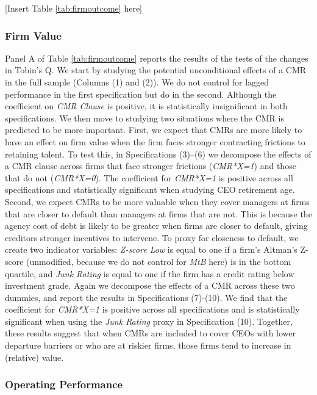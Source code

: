 \documentclass[a4paper,12pt]{article}
\begin{document}
\begin{center}
  [Insert Table \ref{tab:firmoutcome} here]
\end{center}


\subsubsection{Firm Value}

Panel A of Table \ref{tab:firmoutcome} reports the results of the tests of the changes in Tobin's Q.
We start by studying the potential unconditional effects of a CMR in the full sample (Columns (1) and (2)).
We do not control for lagged performance in the first specification but do in the second.
Although the coefficient on \textit{CMR Clause} is positive, it is statistically insignificant in both specifications.
We then move to studying two situations where the CMR is predicted to be more important.
First, we expect that CMRs are more likely to have an effect on firm value when the firm faces stronger contracting frictions to retaining talent.
To test this, in Specifications (3)--(6) we decompose the effects of a CMR clause across firms that face stronger frictions (\textit{CMR*X=1}) and those that do not (\textit{CMR*X=0}).
The coefficient for \textit{CMR*X=1} is positive across all specifications and statistically significant when studying CEO retirement age.
Second, we expect CMRs to be more valuable when they cover managers at firms that are closer to default than managers at firms that are not.
This is because the agency cost of debt is likely to be greater when firms are closer to default, giving creditors stronger incentives to intervene.
To proxy for closeness to default, we create two indicator variables: \textit{Z-score Low} is equal to one if a firm's Altman's Z-score (unmodified, because we do not control for \textit{MtB} here) is in the bottom quartile, and \textit{Junk Rating} is equal to one if the firm has a credit rating below investment grade.
Again we decompose the effects of a CMR across these two dummies, and report the results in Specifications (7)-(10).
We find that the coefficient for \textit{CMR*X=1} is positive across all specifications and is statistically significant when using the \textit{Junk Rating} proxy in Specification (10).
Together, these results suggest that when CMRs are included to cover CEOs with lower departure barriers or who are at riskier firms, those firms tend to increase in (relative) value.




\subsubsection{Operating Performance}
\end{document}
